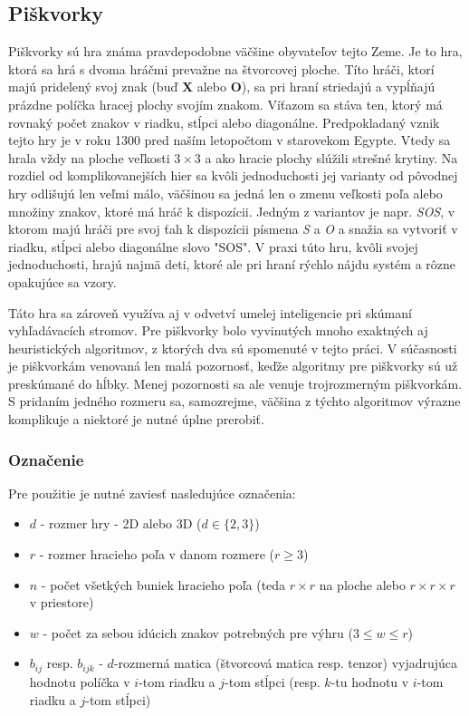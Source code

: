 \subsection{Piškvorky}\label{subsec:tic-tac-toe}

Piškvorky sú hra známa pravdepodobne väčšine obyvateľov tejto Zeme.
Je to hra, ktorá sa hrá s dvoma hráčmi prevažne na štvorcovej ploche.
Títo hráči, ktorí majú pridelený svoj znak (buď \textbf{X} alebo \textbf{O}), sa pri hraní striedajú a vypĺňajú prázdne
políčka hracej plochy svojím znakom.
Víťazom sa stáva ten, ktorý má rovnaký počet znakov v riadku, stĺpci alebo diagonálne.
Predpokladaný vznik tejto hry je v roku 1300 pred naším letopočtom v starovekom
Egypte.\cite{tic_tac_toe_first_appearance}
Vtedy sa hrala vždy na ploche veľkosti $3 \times 3$ a ako hracie plochy slúžili strešné krytiny.
Na rozdiel od komplikovanejších hier sa kvôli jednoduchosti jej varianty od pôvodnej hry odlišujú len veľmi
málo,\cite{tic_tac_toe_variants} väčšinou sa jedná len o zmenu veľkosti poľa alebo množiny znakov, ktoré má hráč k
dispozícii.
Jedným z variantov je napr. \emph{SOS}, v ktorom majú hráči pre svoj ťah k dispozícii písmena \emph{S} a \emph{O} a
snažia sa vytvoriť v riadku, stĺpci alebo diagonálne slovo "SOS".\cite{tic_tac_toe_sos}
V praxi túto hru, kvôli svojej jednoduchosti, hrajú najmä deti, ktoré ale pri hraní rýchlo nájdu systém a rôzne
opakujúce sa vzory.

Táto hra sa zároveň využíva aj v odvetví umelej inteligencie pri skúmaní vyhľadávacích stromov.
Pre piškvorky bolo vyvinutých mnoho exaktných aj heuristických algoritmov, z ktorých dva sú spomenuté v tejto práci.
V súčasnosti je piškvorkám venovaná len malá pozornosť, keďže algoritmy pre piškvorky sú už preskúmané do hĺbky.
Menej pozornosti sa ale venuje trojrozmerným piškvorkám.
S pridaním jedného rozmeru sa, samozrejme, väčšina z týchto algoritmov výrazne komplikuje a niektoré je nutné úplne
prerobiť.

\subsubsection{Označenie}

Pre použitie je nutné zaviesť nasledujúce označenia:
\begin{itemize}
    \item $d$ - rozmer hry - 2D alebo 3D ($d \in \{2,3\}$)
    \item $r$ - rozmer hracieho poľa v danom rozmere ($r \geq 3$)
    \item $n$ - počet všetkých buniek hracieho poľa (teda $r \times r$ na ploche alebo $r \times r \times r$ v
    priestore)
    \item $w$ - počet za sebou idúcich znakov potrebných pre výhru ($3 \leq w \leq r$)
    \item $b_{ij}$ resp. $b_{ijk}$ - $d$-rozmerná matica (štvorcová matica resp. tenzor) vyjadrujúca hodnotu políčka v
    $i$-tom riadku a $j$-tom stĺpci (resp. $k$-tu hodnotu v $i$-tom riadku a $j$-tom stĺpci)
\end{itemize}

